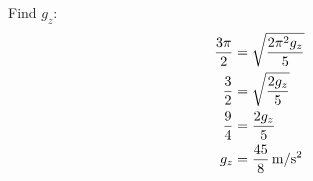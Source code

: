 \documentclass[fleqn,addpoints]{exam}
\begin{document}
\begin{questions}
\begin{parts}
\begin{solution}
            Find $g_z$:
            \begin{align*}
              \frac{3 \pi}{2} & = \sqrt{ \frac{2 \pi^2 g_z}{5}} \\
              \frac{3}{2}     & = \sqrt{ \frac{2 g_z}{5}} \\
              \frac{9}{4}     & = \frac{2 g_z}{5} \\
              g_z             & = \unit[\frac{45}{8}]{m/s^2} \\
            \end{align*}

          \end{solution}
      \end{parts}

  \end{questions}
\end{document}
